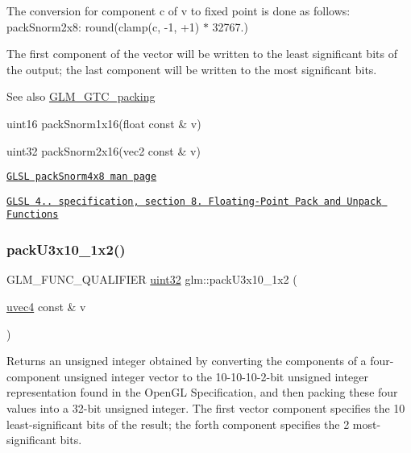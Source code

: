 The conversion for component c of v to fixed point is done as follows\+: pack\+Snorm2x8\+: round(clamp(c, -\/1, +1) $\ast$ 32767.)

The first component of the vector will be written to the least significant bits of the output; the last component will be written to the most significant bits.

\begin{DoxySeeAlso}{See also}
\hyperlink{group__gtc__packing}{G\+L\+M\+\_\+\+G\+T\+C\+\_\+packing} 

uint16 pack\+Snorm1x16(float const \& v) 

uint32 pack\+Snorm2x16(vec2 const \& v) 

\href{http://www.opengl.org/sdk/docs/manglsl/xhtml/packSnorm4x8.xml}{\tt G\+L\+SL pack\+Snorm4x8 man page} 

\href{http://www.opengl.org/registry/doc/GLSLangSpec.4.20.8.pdf}{\tt G\+L\+SL 4.. specification, section 8. Floating-\/\+Point Pack and Unpack Functions} 
\end{DoxySeeAlso}
\mbox{\label{group__gtc__packing_gaf656d8862628f96b20de7a36eaa1fe56}} 
\subsubsection{\texorpdfstring{pack\+U3x10\+\_\+1x2()}{packU3x10\_1x2()}}
{\footnotesize\ttfamily G\+L\+M\+\_\+\+F\+U\+N\+C\+\_\+\+Q\+U\+A\+L\+I\+F\+I\+ER \hyperlink{group__gtc__type__precision_ga202b6a53c105fcb7e531f9b443518451}{uint32} glm\+::pack\+U3x10\+\_\+1x2 (\begin{DoxyParamCaption}\item[{\hyperlink{group__core__types_ga1c426d19627b32b14f0089f7f4ba7b1d}{uvec4} const \&}]{v }\end{DoxyParamCaption})}

Returns an unsigned integer obtained by converting the components of a four-\/component unsigned integer vector to the 10-\/10-\/10-\/2-\/bit unsigned integer representation found in the Open\+GL Specification, and then packing these four values into a 32-\/bit unsigned integer. The first vector component specifies the 10 least-\/significant bits of the result; the forth component specifies the 2 most-\/significant bits.

